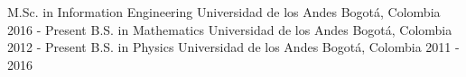 

\begin{cventries}

\vspace{-1cm}
\cventry{}{}{}{}{}
\noindent
\cventry
{M.Sc. in Information Engineering} %
{Universidad de los Andes} %
{Bogotá, Colombia} %
{2016 - Present} %
{}
\cventry
{B.S. in Mathematics} %
{Universidad de los Andes} %
{Bogotá, Colombia} %
{2012 - Present} %
{}
\cventry
{B.S. in Physics} %
{Universidad de los Andes} %
{Bogotá, Colombia} %
{2011 - 2016} %
{}

\vspace{-0.5cm}
\end{cventries}
